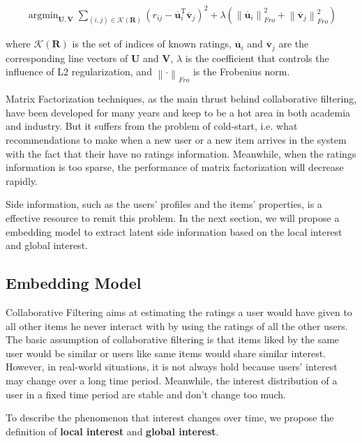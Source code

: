 \documentclass{sig-alternate-05-2015}
\DeclareMathOperator*{\argmin}{argmin}
\begin{document}
\begin{equation}
\begin{aligned}
	\argmin_{\mathbf{U},\mathbf{V}}
	\sum_{(i,j) \in \mathcal{K}(\mathbf{R})}
	( r_{ij} - \overline{\mathbf{u}}_i^{\mathrm{T}} \overline{\mathbf{v}}_j ) ^ 2 +
	\lambda ( \left\| \overline{\mathbf{u}}_i \right\|_{Fro}^2 +
	\left\| \overline{\mathbf{v}}_j \right\|_{Fro}^2 )
\end{aligned}
\end{equation}

where $\mathcal{K}(\mathbf{R})$ is the set of indices of known ratings,
$\overline{\mathbf{u}}_i$ and $\overline{\mathbf{v}}_j$
are the corresponding line vectors of $\mathbf{U}$ and $\mathbf{V}$,
$\lambda$ is the coefficient that controls the influence of L2 regularization,
and $\left\| \cdot \right\|_{Fro}$ is the Frobenius norm.

Matrix Factorization techniques, as the main thrust behind collaborative filtering,
have been developed for many years and keep to be a hot area in both academia and industry.
But it suffers from the problem of cold-start,
i.e. what recommendations to make when a new user or a new item arrives in the system
with the fact that their have no ratings information.
Meanwhile, when the ratings information is too sparse,
the performance of matrix factorization will decrease rapidly.

Side information, such as the users' profiles and the items' properties,
is a effective resource to remit this problem.
In the next section, we will propose a embedding model
to extract latent side information based on the local interest and global interest.

\subsection{Embedding Model}
Collaborative Filtering aims at estimating the ratings
a user would have given to all other items he never interact with
by using the ratings of all the other users.
The basic assumption of collaborative filtering is that
items liked by the same user would be similar
or users like same items would share similar interest.
However, in real-world situations,
it is not always hold because users' interest may change over
a long time period.
Meanwhile, the interest distribution of a user in a fixed time period
are stable and don't change too much.

To describe the phenomenon that interest changes over time,
we propose the definition of \textbf{local interest} and \textbf{global interest}.
\end{document}

